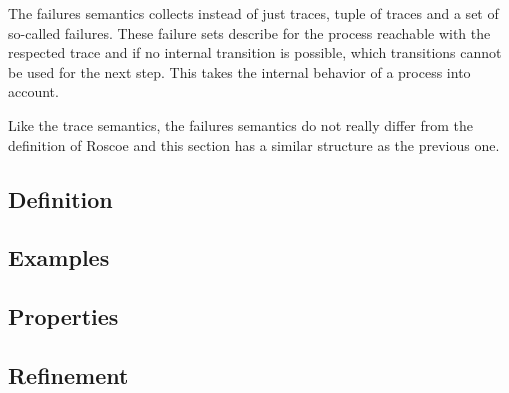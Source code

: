 The failures semantics collects instead of just traces, tuple of traces and a set of so-called failures. These failure sets describe for the process reachable with the respected trace and if no internal transition is possible, which transitions cannot be used for the next step. This takes the internal behavior of a process into account.

Like the trace semantics, the failures semantics do not really differ from the definition of Roscoe and this section has a similar structure as the previous one.
\subsection{Definition}
\label{sec_de_sem_failures_def}

\subsection{Examples}
\label{sec_de_sem_failures_bsp}

\subsection{Properties}
\label{sec_de_sem_failures_prop}

\subsection{Refinement}
\label{sec_de_sem_failures_ref}
